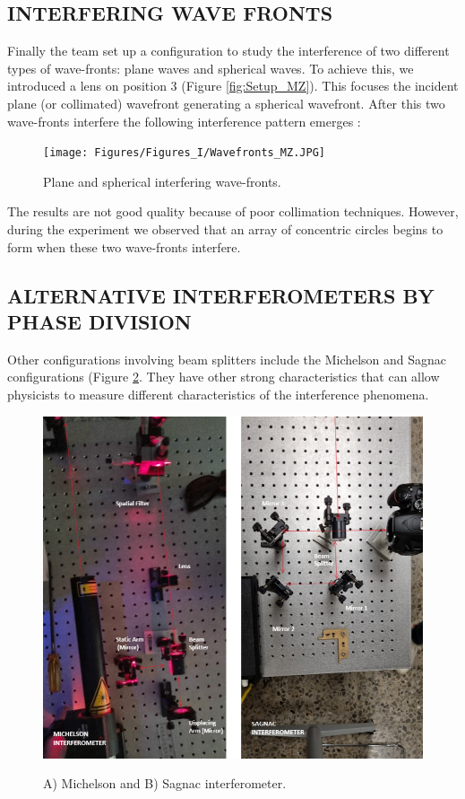 \subsection{INTERFERING WAVE FRONTS}
Finally the team set up a configuration to study the interference of two different types of wave-fronts: plane waves and spherical waves. To achieve this, we introduced a lens on position 3 (Figure \ref{fig:Setup_MZ}). This focuses the incident plane (or collimated) wavefront generating a spherical wavefront. After this two wave-fronts interfere the following interference pattern emerges \cite{fig:Wavefronts}: 
\begin{figure}[H]
    \centering
    \texttt{[image: Figures/Figures\_I/Wavefronts\_MZ.JPG]}
    \label{fig:Wavefronts}
    \caption{Plane and spherical interfering wave-fronts.}
\end{figure}
The results are not good quality because of poor collimation techniques. However, during the experiment we observed that an array of concentric circles begins to form when these two wave-fronts interfere. 

\subsection{ALTERNATIVE INTERFEROMETERS BY PHASE DIVISION} 

Other configurations involving beam splitters include the Michelson and Sagnac configurations (Figure \ref{fig:MS}. They have other strong characteristics that can allow physicists to measure different characteristics of the interference phenomena. 

\begin{figure}[H]
    \centering
    \includegraphics[scale=0.33]{Figures/Figures_I/MichelsonSagnac.png}
    \label{fig:MS}
    \caption{A) Michelson and B) Sagnac interferometer.}
\end{figure}

